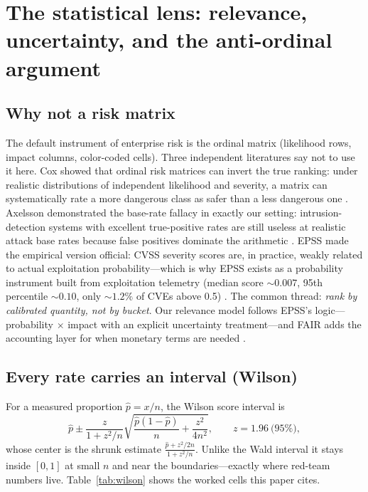 \section{The statistical lens: relevance, uncertainty, and the anti-ordinal
argument}\label{sec:stats}

\subsection{Why not a risk matrix}\label{sec:antiordinal}

The default instrument of enterprise risk is the ordinal matrix (likelihood
rows, impact columns, color-coded cells). Three independent literatures say not
to use it here. Cox showed that ordinal risk matrices can invert the true
ranking: under realistic distributions of independent likelihood and severity, a
matrix can systematically rate a more dangerous class as safer than a less
dangerous one \cite{cox2008}. Axelsson demonstrated the base-rate fallacy in
exactly our setting: intrusion-detection systems with excellent true-positive
rates are still useless at realistic attack base rates because false positives
dominate the arithmetic \cite{axelsson1999}. EPSS made the empirical version
official: CVSS severity scores are, in practice, weakly related to actual
exploitation probability---which is why EPSS exists as a probability instrument
built from exploitation telemetry (median score ${\sim}0.007$, 95th percentile
${\sim}0.10$, only ${\sim}1.2\%$ of CVEs above 0.5) \cite{epss-first,epss-paper}.
The common thread: \emph{rank by calibrated quantity, not by bucket}. Our
relevance model follows EPSS's logic---probability $\times$ impact with an
explicit uncertainty treatment---and FAIR adds the
accounting layer for when monetary terms are needed \cite{fair}.

\subsection{Every rate carries an interval (Wilson)}\label{sec:wilson}

For a measured proportion $\hat p = x/n$, the Wilson score interval is
\begin{equation}
\hat p \pm \frac{z}{1+z^2/n}\sqrt{\frac{\hat p(1-\hat p)}{n}+\frac{z^2}{4n^2}},
\qquad z = 1.96\ \text{(95\%)},
\label{eq:wilson}
\end{equation}
whose center is the shrunk estimate
$\frac{\hat p + z^2/2n}{1+z^2/n}$. Unlike the Wald interval it stays inside
$[0,1]$ at small $n$ and near the boundaries---exactly where red-team numbers
live. Table~\ref{tab:wilson} shows the worked cells this paper cites.

